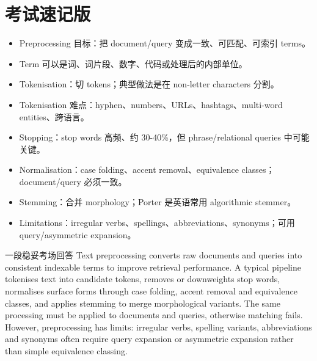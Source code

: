 \documentclass[11pt,a4paper]{ctexart}
\begin{document}
\section{考试速记版}
\begin{itemize}
\item Preprocessing 目标：把 document/query 变成一致、可匹配、可索引 terms。
\item Term 可以是词、词片段、数字、代码或处理后的内部单位。
\item Tokenisation：切 tokens；典型做法是在 non-letter characters 分割。
\item Tokenisation 难点：hyphen、numbers、URLs、hashtags、multi-word entities、跨语言。
\item Stopping：stop words 高频、约 30-40\%，但 phrase/relational queries 中可能关键。
\item Normalisation：case folding、accent removal、equivalence classes；document/query 必须一致。
\item Stemming：合并 morphology；Porter 是英语常用 algorithmic stemmer。
\item Limitations：irregular verbs、spellings、abbreviations、synonyms；可用 query/asymmetric expansion。
\end{itemize}
\begin{callout}{一段稳妥考场回答}
Text preprocessing converts raw documents and queries into consistent indexable terms to improve retrieval performance. A typical pipeline tokenises text into candidate tokens, removes or downweights stop words, normalises surface forms through case folding, accent removal and equivalence classes, and applies stemming to merge morphological variants. The same processing must be applied to documents and queries, otherwise matching fails. However, preprocessing has limits: irregular verbs, spelling variants, abbreviations and synonyms often require query expansion or asymmetric expansion rather than simple equivalence classing.
\end{callout}
\end{document}

